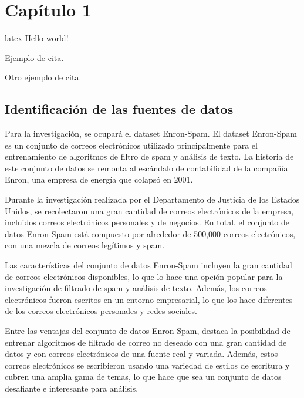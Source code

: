 \newpage

\begin{center}
\vspace*{15em}
{\huge\bfseries\color{blue}{Capítulo 1}\par}
{\huge\bfseries\color{blue}{Los Datos y el Problema}\par}
\end{center}
\chapter{Capítulo 1}
\gls{latex}
Hello world!~\cite{Carpizo1998}

Ejemplo de cita. \cite{Kelsen1969}

Otro ejemplo de cita. \cite{Castro1998}
\section{Identificación de las fuentes de datos}
Para la investigación, se ocupará el dataset Enron-Spam.
El dataset Enron-Spam es un conjunto de correos electrónicos utilizado principalmente para el entrenamiento de algoritmos de filtro de spam y análisis de texto. La historia de este conjunto de datos se remonta al escándalo de contabilidad de la compañía Enron, una empresa de energía que colapsó en 2001.

Durante la investigación realizada por el Departamento de Justicia de los Estados Unidos, se recolectaron una gran cantidad de correos electrónicos de la empresa, incluidos correos electrónicos personales y de negocios. En total, el conjunto de datos Enron-Spam está compuesto por alrededor de 500,000 correos electrónicos, con una mezcla de correos legítimos y spam.

Las características del conjunto de datos Enron-Spam incluyen la gran cantidad de correos electrónicos disponibles, lo que lo hace una opción popular para la investigación de filtrado de spam y análisis de texto. Además, los correos electrónicos fueron escritos en un entorno empresarial, lo que los hace diferentes de los correos electrónicos personales y redes sociales.

Entre las ventajas del conjunto de datos Enron-Spam, destaca la posibilidad de entrenar algoritmos de filtrado de correo no deseado con una gran cantidad de datos y con correos electrónicos de una fuente real y variada. Además, estos correos electrónicos se escribieron usando una variedad de estilos de escritura y cubren una amplia gama de temas, lo que hace que sea un conjunto de datos desafiante e interesante para análisis.

